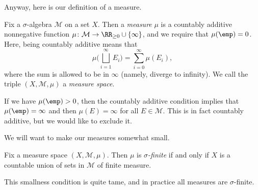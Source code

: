 \documentclass[../notes.tex]{subfiles}
\begin{document}
Anyway, here is our definition of a measure.
\begin{definition}[measure] \label{def:meas}
	Fix a $\sigma$-algebra $\mathcal M$ on a set $X$. Then a \textit{measure} $\mu$ is a countably additive nonnegative function $\mu\colon\mathcal M\to\RR_{\ge0}\cup\{\infty\}$, and we require that $\mu(\emp)=0$. Here, being countably additive means that
	\[\mu\Bigg(\bigsqcup_{i=1}^\infty E_i\Bigg)=\sum_{i=0}^\infty\mu(E_i),\]
	where the sum is allowed to be in $\infty$ (namely, diverge to infinity). We call the triple $(X,\mathcal M,\mu)$ a \textit{measure space}.
\end{definition}
\begin{remark}
	If we have $\mu(\emp)>0$, then the countably additive condition implies that $\mu(\emp)=\infty$ and then $\mu(E)=\infty$ for all $E\in\mathcal M$. This is in fact countably additive, but we would like to exclude it.
\end{remark}
We will want to make our measures somewhat small.
\begin{defihelper}  \label{def:sigma-finite}
	Fix a measure space $(X,\mathcal M,\mu)$. Then $\mu$ is \textit{$\sigma$-finite} if and only if $X$ is a countable union of sets in $\mathcal M$ of finite measure.
\end{defihelper}
This smallness condition is quite tame, and in practice all measures are $\sigma$-finite.
\end{document}
